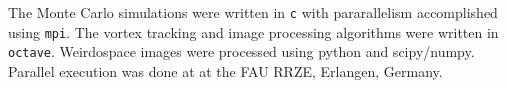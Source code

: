 \documentclass[a4paper,titlepage,onecolumn]{report}
\begin{document}
The Monte Carlo simulations were written in \texttt{c} with pararallelism
accomplished using \texttt{mpi}. The vortex tracking and image processing
algorithms were written in \texttt{octave}.  Weirdospace images were
processed using python and scipy/numpy.  Parallel execution was done at at
the FAU RRZE, Erlangen, Germany.
\end{document}
